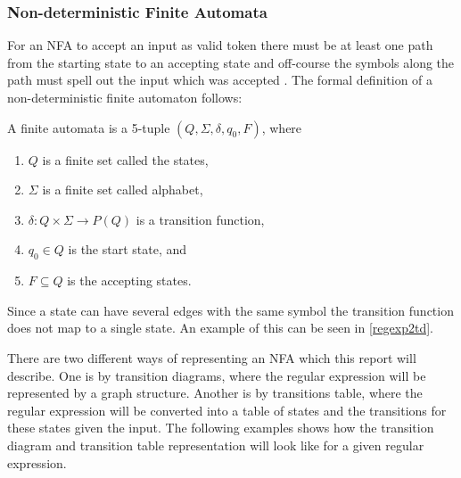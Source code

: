 \subsubsection{Non-deterministic Finite Automata}
For an NFA to accept an input as valid token there must be at least one path
from the starting state to an accepting state and off-course the symbols along
the path must spell out the input which was accepted \cite{Aho2006}.
The formal definition of a non-deterministic finite automaton follows:
\begin{definition} \label{finiteAutomataDef}
A finite automata is a 5-tuple $(Q, \Sigma, \delta, q_0, F)$, where
\begin{enumerate}
  \item $Q$ is a finite set called the states,
  \item $\Sigma$ is a finite set called alphabet,
  \item $\delta: Q \times \Sigma \to P(Q)$ is a transition function,
  \item $q_0 \in Q$ is the start state, and
  \item $F \subseteq Q$ is the accepting states.
\end{enumerate} 
\end{definition}

Since a state can have several edges with the same symbol the transition
function does not map to a single state. An example of this can be seen in
\cref{regexp2td}.

There are two different ways of representing an NFA which this report will
describe. One is by transition diagrams, where the regular expression will be
represented by a graph structure. Another is by transitions table, where the 
regular expression will be converted into a table of states and the 
transitions for these states given the input. The following examples shows how 
the transition diagram and transition table representation will look like for a 
given regular expression.

